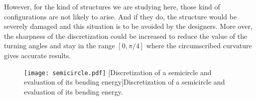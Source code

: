 However, for the kind of structures we are studying here, those kind of configurations are not likely to arise. And if they do, the structure would be severely damaged and this situation is to be avoided by the designers. More over, the sharpness of the discretization could be increased to reduce the value of the turning angles and stay in the range $[0,\pi/4]$ where the circumscribed curvature gives accurate results.

\begin{figure}[p]
\centering
\captionsetup[subfloat]{captionskip=10pt}
\begin{fullpage}
	\texttt{[image: semicircle.pdf]}
	[Discretization of a semicircle and evaluation of its bending energy]{Discretization of a semicircle and evaluation of its bending energy.}
	\label{fig:semicircle}
	\vspace{20mm}
	\Table
	\hspace{5mm}
\end{fullpage}
\end{figure}
